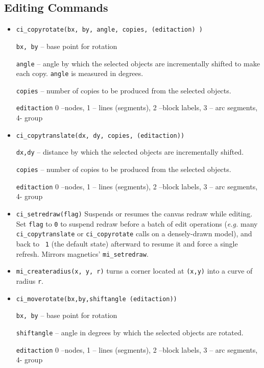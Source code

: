 \subsection{Editing Commands}
\begin{itemize}

\item \texttt{ci\_copyrotate(bx, by, angle, copies, (editaction) )}

\texttt{bx, by} -- base point for rotation

\texttt{angle} -- angle by which the selected objects are incrementally
shifted to make each copy. \texttt{angle} is measured in degrees.

\texttt{copies} -- number of copies to be produced from the selected
objects.

\texttt{editaction} 0 --nodes, 1 -- lines (segments), 2 --block labels, 3 --
arc segments, 4- group

\item \texttt{ci\_copytranslate(dx, dy, copies, (editaction))}

\texttt{dx,dy} -- distance by which the selected objects are incrementally
shifted.

\texttt{copies} -- number of copies to be produced from the selected
objects.

\texttt{editaction} 0 --nodes, 1 -- lines (segments), 2 --block labels, 3 --
arc segments, 4- group

\item{\tt ci\_setredraw(flag)} Suspends or resumes the canvas redraw
while editing. Set {\tt flag} to {\tt 0} to suspend redraw before a
batch of edit operations ({\em e.g.} many {\tt ci\_copytranslate} or
{\tt ci\_copyrotate} calls on a densely-drawn model), and back to {\tt
1} (the default state) afterward to resume it and force a single
refresh. Mirrors magnetics' {\tt mi\_setredraw}.

\item{\tt mi\_createradius(x, y, r)} turns a corner located at {\tt (x,y)} into a curve of radius {\tt r}.

\item \texttt{ci\_moverotate(bx,by,shiftangle (editaction))}

\texttt{bx, by} -- base point for rotation

\texttt{shiftangle} -- angle in degrees by which the selected objects are
rotated.

\texttt{editaction} 0 --nodes, 1 -- lines (segments), 2 --block labels, 3 --
arc segments, 4- group


\end{itemize}

